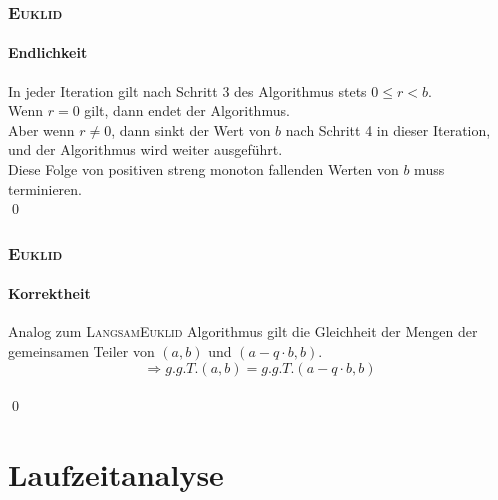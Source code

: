 \documentclass[•]{beamer}
\begin{document}
\begin{frame}
\frametitle{\textsc{Euklid}}
\framesubtitle{Endlichkeit}
In jeder Iteration gilt nach Schritt 3 des Algorithmus stets $0 \leq r < b$.
\vspace{5pt}
\\Wenn $r=0$ gilt, dann endet der Algorithmus. \\Aber wenn $r \neq 0$, dann sinkt der Wert von $b$ nach Schritt 4 in dieser Iteration, und der Algorithmus wird weiter ausgef\"uhrt. \\Diese Folge von positiven streng monoton fallenden Werten von $b$ muss terminieren. \\ \qed
\end{frame}

\begin{frame}
	\frametitle{\textsc{Euklid}}
	\framesubtitle{Korrektheit}
	Analog zum \textsc{LangsamEuklid} Algorithmus gilt die Gleichheit der Mengen der gemeinsamen Teiler von $(a,b)$ und $(a - q \cdot b, b)$. \\
	$$\Rightarrow \textit{g.g.T.}(a,b) = \textit{g.g.T.}(a-q\cdot b, b)$$ \\ \qed
\end{frame}


\section{Laufzeitanalyse}
\end{document}
